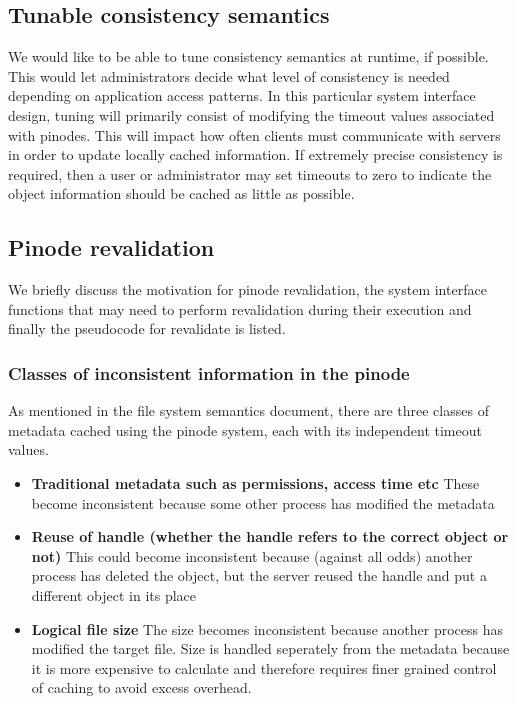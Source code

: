 \documentclass[11pt, letterpaper]{article}
\begin{document}
\subsection{Tunable consistency semantics}

We would like to be able to tune consistency semantics at runtime, if
possible.  This would let administrators decide what level of
consistency is needed depending on application access patterns.  In this
particular system interface design, tuning will primarily consist of
modifying the timeout values associated with pinodes.  This will impact
how often clients must communicate with servers in order to update
locally cached information.  If extremely precise consistency is
required, then a user or administrator may set timeouts to zero to
indicate the object information should be cached as little as possible.

\subsection{Pinode revalidation}

We briefly discuss the motivation for pinode revalidation, the system 
interface functions that may need to perform revalidation during their
execution and finally the pseudocode for revalidate is listed.

\subsubsection{Classes of inconsistent information in the pinode}

As mentioned in the file system semantics document, there are
three
classes of metadata cached using the pinode system, each with its
independent timeout values.

\begin{itemize}
\item \textbf{Traditional metadata such as permissions, access time etc}
These become inconsistent because some other process has modified 
the metadata

\item \textbf{Reuse of handle (whether the handle refers to the correct
object or not)}
This could become inconsistent because (against all odds) another process
has deleted the object, but the server reused the handle and put a 
different object in its place

\item \textbf{Logical file size} The size becomes inconsistent
because another process has modified the target file.  Size is
handled seperately from the metadata because it is more expensive
to calculate and therefore requires finer grained control of
caching to avoid excess overhead.
\end{itemize}
\end{document}
